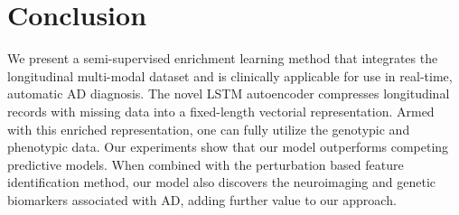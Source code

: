 \iffalse
An important characteristic of the present study was the use of a semi-supervised classification method for the AD conversion prediction in MCI subjects. The semi-supervised method (LDS) was shown to outperform its counterpart supervised method (SVM) in the design of MRI biomarker.
\fi
\section{Conclusion}
We present a semi-supervised enrichment learning method that integrates the longitudinal multi-modal dataset and is clinically applicable for use in real-time, automatic AD diagnosis. The novel LSTM autoencoder compresses longitudinal records with missing data into a fixed-length vectorial representation. Armed with this enriched representation, one can fully utilize the genotypic and phenotypic data. Our experiments show that our model outperforms competing predictive models. When combined with the perturbation based feature identification method, our model also discovers the neuroimaging and genetic biomarkers associated with AD, adding further value to our approach.
